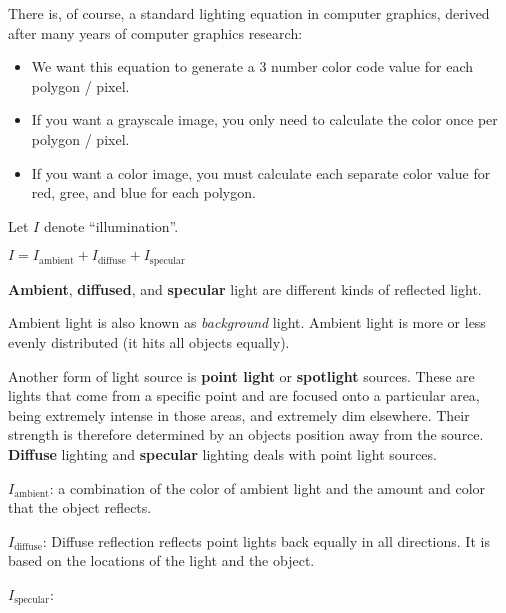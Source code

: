 \documentclass[11pt,fleqn]{article}
\theoremstyle{definition}
\begin{document}
There is, of course, a standard lighting equation in computer graphics, derived after
many years of computer graphics research:

\begin{itemize}
    \item We want this equation to generate a 3 number color code value for each
        polygon / pixel.
    \item If you want a grayscale image, you only need to calculate the color once
        per polygon / pixel.
    \item If you want a color image, you must calculate each separate color value for
        red, gree, and blue for each polygon.
\end{itemize}

Let $I$ denote ``illumination''.

\begin{center}
    $I = I_{\text{ambient}} + I_{\text{diffuse}} + I_{\text{specular}}$
\end{center}

\textbf{Ambient}, \textbf{diffused}, and \textbf{specular} light are different kinds
of reflected light.

Ambient light is also known as \textit{background} light. Ambient light is more or
less evenly distributed (it hits all objects equally).

Another form of light source is \textbf{point light} or \textbf{spotlight} sources.
These are lights that come from a specific point and are focused onto a particular
area, being extremely intense in those areas, and extremely dim elsewhere. Their
strength is therefore determined by an objects position away from the source.
\textbf{Diffuse} lighting and \textbf{specular} lighting deals with point light
sources.

$I_{\text{ambient}}$: a combination of the color of ambient light and the amount and
color that the object reflects.

$I_{\text{diffuse}}$: Diffuse reflection reflects point lights back equally in all
directions. It is based on the locations of the light and the object.

$I_{\text{specular}}$: %
\end{document}
